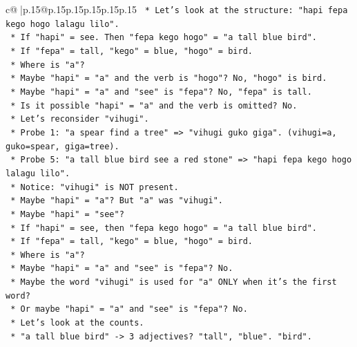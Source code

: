 \documentclass{article}
\begin{document}
{\begin{supertabular}{c@{$\;$}|p{.15\linewidth}@{}p{.15\linewidth}p{.15\linewidth}p{.15\linewidth}p{.15\linewidth}p{.15\linewidth}}
{{{\texttt{                        *   Let's look at the structure: "hapi fepa kego hogo lalagu lilo".} \\
\texttt{                        *   If "hapi" = see. Then "fepa kego hogo" = "a tall blue bird".} \\
\texttt{                        *   If "fepa" = tall, "kego" = blue, "hogo" = bird.} \\
\texttt{                        *   Where is "a"?} \\
\texttt{                        *   Maybe "hapi" = "a" and the verb is "hogo"? No, "hogo" is bird.} \\
\texttt{                        *   Maybe "hapi" = "a" and "see" is "fepa"? No, "fepa" is tall.} \\
\texttt{                        *   Is it possible "hapi" = "a" and the verb is omitted? No.} \\
\texttt{                        *   Let's reconsider "vihugi".} \\
\texttt{                        *   Probe 1: "a spear find a tree" => "vihugi guko giga". (vihugi=a, guko=spear, giga=tree).} \\
\texttt{                        *   Probe 5: "a tall blue bird see a red stone" => "hapi fepa kego hogo lalagu lilo".} \\
\texttt{                        *   Notice: "vihugi" is NOT present.} \\
\texttt{                        *   Maybe "hapi" = "a"? But "a" was "vihugi".} \\
\texttt{                        *   Maybe "hapi" = "see"?} \\
\texttt{                        *   If "hapi" = see, then "fepa kego hogo" = "a tall blue bird".} \\
\texttt{                        *   If "fepa" = tall, "kego" = blue, "hogo" = bird.} \\
\texttt{                        *   Where is "a"?} \\
\texttt{                        *   Maybe "hapi" = "a" and "see" is "fepa"? No.} \\
\texttt{                        *   Maybe the word "vihugi" is used for "a" ONLY when it's the first word?} \\
\texttt{                        *   Or maybe "hapi" = "a" and "see" is "fepa"? No.} \\
\texttt{                        *   Let's look at the counts.} \\
\texttt{                        *   "a tall blue bird" {-}> 3 adjectives? "tall", "blue". "bird".} \\
}}}
\end{supertabular}}
\end{document}
